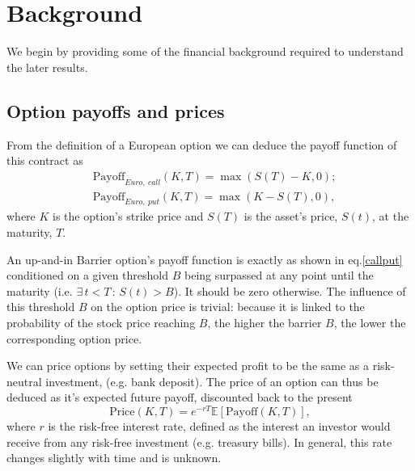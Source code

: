 
\section{Background}
\label{sec:backg}
We begin by providing some of the financial background required to understand the later results.

\subsection{Option payoffs and prices}
From the definition of a European option we can deduce the payoff function of this contract as
\begin{subequations}\label{callput}
\begin{align}
&\text{Payoff}_{Euro,\ call}(K,T)=\max\left(S(T)-K,0\right);\\
&\text{Payoff}_{Euro,\ put}(K,T)=\max\left(K-S(T),0\right),
\end{align}
\end{subequations}
\noindent where $K$ is the option's strike price and $S(T)$ is the asset's price, $S(t)$, at the maturity, $T$.


An up-and-in Barrier option's payoff function is exactly as shown in eq.\eqref{callput} conditioned on a given threshold $B$ being surpassed at any point until the maturity (i.e. $\exists\,t<T\,:\,S(t)>B$). It should be zero otherwise.
The influence of this threshold $B$ on the option price is trivial: because it is linked to the probability of the stock price reaching $B$, the higher the barrier $B$, the lower the corresponding option price.

We can price options by setting their expected profit to be the same as a risk-neutral investment, (e.g. bank deposit). The price of an option can thus be deduced as it's expected future payoff, discounted back to the present
\begin{equation}\label{pricepayoff}
\text{Price}(K,T)=e^{-rT}\mathbb{E}\left[\text{Payoff}(K,T)\right],
\end{equation}
\noindent where $r$ is the risk-free interest rate, defined as the interest an investor would receive from any risk-free investment (e.g. treasury bills). In general, this rate changes slightly with time and is unknown.

